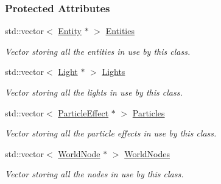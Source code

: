 \subsubsection*{Protected Attributes}
\begin{DoxyCompactItemize}
\item 
\hypertarget{classMezzanine_1_1SceneManager_afd99b7352531d06ff6ec3784ab0c3532}{
std::vector$<$ \hyperlink{classMezzanine_1_1Entity}{Entity} $\ast$ $>$ \hyperlink{classMezzanine_1_1SceneManager_afd99b7352531d06ff6ec3784ab0c3532}{Entities}}
\label{classMezzanine_1_1SceneManager_afd99b7352531d06ff6ec3784ab0c3532}

\begin{DoxyCompactList}\small\item\em Vector storing all the entities in use by this class. \item\end{DoxyCompactList}\item 
\hypertarget{classMezzanine_1_1SceneManager_ae6617e5a9daa666e657f01ce25a8d1ec}{
std::vector$<$ \hyperlink{classMezzanine_1_1Light}{Light} $\ast$ $>$ \hyperlink{classMezzanine_1_1SceneManager_ae6617e5a9daa666e657f01ce25a8d1ec}{Lights}}
\label{classMezzanine_1_1SceneManager_ae6617e5a9daa666e657f01ce25a8d1ec}

\begin{DoxyCompactList}\small\item\em Vector storing all the lights in use by this class. \item\end{DoxyCompactList}\item 
\hypertarget{classMezzanine_1_1SceneManager_af30c9b895cf2c991892d71aa481a82a1}{
std::vector$<$ \hyperlink{classMezzanine_1_1ParticleEffect}{ParticleEffect} $\ast$ $>$ \hyperlink{classMezzanine_1_1SceneManager_af30c9b895cf2c991892d71aa481a82a1}{Particles}}
\label{classMezzanine_1_1SceneManager_af30c9b895cf2c991892d71aa481a82a1}

\begin{DoxyCompactList}\small\item\em Vector storing all the particle effects in use by this class. \item\end{DoxyCompactList}\item 
\hypertarget{classMezzanine_1_1SceneManager_a0bbe199bc6b6e41d23428712dd3a3d23}{
std::vector$<$ \hyperlink{classMezzanine_1_1WorldNode}{WorldNode} $\ast$ $>$ \hyperlink{classMezzanine_1_1SceneManager_a0bbe199bc6b6e41d23428712dd3a3d23}{WorldNodes}}
\label{classMezzanine_1_1SceneManager_a0bbe199bc6b6e41d23428712dd3a3d23}

\begin{DoxyCompactList}\small\item\em Vector storing all the nodes in use by this class. \item\end{DoxyCompactList}\end{DoxyCompactItemize}


